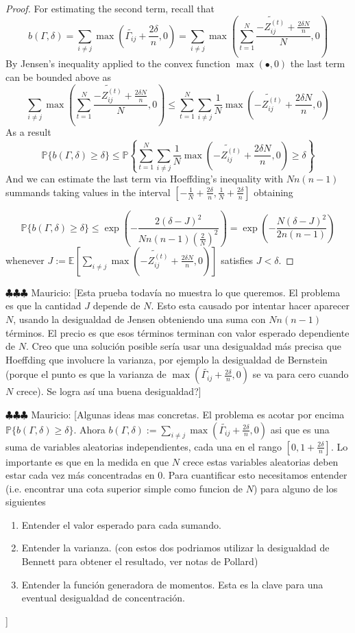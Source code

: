 \documentclass[12pt]{amsart}
\theoremstyle{remark}
\newcommand{\PP}{\mathbb{P}}
\newcommand{\EE}{\mathbb{E}}
\newcommand{\mv}[1]{{\color{red} \sf $\clubsuit\clubsuit\clubsuit$ Mauricio: [#1]}}
\begin{document}
\begin{proof}
For estimating the second term, recall that
\[b(\Gamma,\delta)= \sum_{i\neq j} \max\left(\widetilde{\Gamma_{ij}}+\frac{2\delta}{n},0\right) = \sum_{i\neq j} \max\left(\sum_{t=1}^N\frac{\widetilde{-Z_{ij}^{(t)}}+\frac{2\delta N}{n}}{N},0\right)\]
By Jensen's inequality applied to the convex function $\max(\bullet,0)$ the last term can be bounded above as
\[
\sum_{i\neq j} \max\left(\sum_{t=1}^N\frac{\widetilde{-Z_{ij}^{(t)}}+\frac{2\delta N}{n}}{N},0\right)\leq \sum_{t=1}^N \sum_{i\neq j}  \frac{1}{N} \max\left(\widetilde{-Z_{ij}^{(t)}}+\frac{2\delta N}{n},0\right)
\]
As a result
\[\PP\{b(\Gamma,\delta)\geq \delta\}\leq \PP\left\{ \sum_{t=1}^N \sum_{i\neq j}  \frac{1}{N} \max\left(\widetilde{-Z_{ij}^{(t)}}+\frac{2\delta N}{n},0\right)\geq \delta\right\}\]
And we can estimate the last term via Hoeffding's inequality with $Nn(n-1)$ summands taking values in the interval $\left[-\frac{1}{N}+\frac{2\delta}{n},\frac{1}{N}+\frac{2\delta}{n}\right]$ obtaining

\[\PP\{b(\Gamma,\delta)\geq \delta\}\leq \exp\left( -\frac{2(\delta-J)^2}{Nn(n-1)\left(\frac{2}{N}\right)^2}\right)=\exp\left(-\frac{N(\delta-J)^2}{2n(n-1)}\right)\]
whenever $J:=\EE\left[\sum_{i\neq j}\max\left(\widetilde{-Z_{ij}^{(t)}}+\frac{2\delta N}{n},0\right)\right]$ satisfies $J<\delta$.
\end{proof}

\mv{Esta prueba todav\'ia no muestra lo que queremos. El problema es que la cantidad $J$ depende de $N$. Esto esta causado por intentar hacer aparecer $N$, usando la desigualdad de Jensen obteniendo una suma con $Nn(n-1)$ t\'erminos. El precio es que esos t\'erminos terminan con valor esperado dependiente de $N$. Creo que una soluci\'on posible ser\'ia usar una desigualdad m\'as precisa que Hoeffding que involucre la varianza, por ejemplo la desigualdad de Bernstein (porque el punto es que la varianza de $\max(\widetilde{\Gamma_{ij}}+\frac{2\delta}{n},0)$ se va para cero cuando $N$ crece). Se logra as\'i una buena desigualdad?} 

\mv{Algunas ideas mas concretas. El problema es acotar por encima $\PP\{b(\Gamma,\delta)\geq \delta\}$. Ahora $b(\Gamma,\delta):=\sum_{i\neq j} \max\left(\widetilde{\Gamma_{ij}}+\frac{2\delta}{n},0\right)$ asi que es una suma de variables aleatorias independientes, cada una en el rango $[0, 1+ \frac{2\delta}{n}]$. Lo importante es que en la medida en que $N$ crece estas variables aleatorias deben estar cada vez m\'as concentradas en $0$. Para cuantificar esto necesitamos entender (i.e. encontrar una cota superior simple como funcion de $N$) para alguno de los siguientes 
\begin{enumerate}
\item Entender el valor esperado para cada sumando.
\item Entender la varianza. (con estos dos podriamos utilizar la desigualdad de Bennett para obtener el resultado, ver notas de Pollard) 
\item Entender la funci\'on generadora de momentos. Esta es la clave para una eventual desigualdad de concentraci\'on.
\end{enumerate}
}
\end{document}
